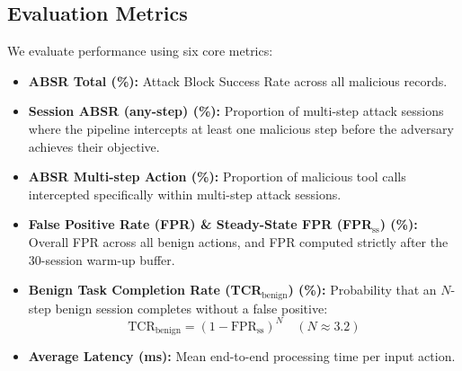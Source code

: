 \documentclass[conference]{IEEEtran}
\begin{document}
\subsection{Evaluation Metrics}
We evaluate performance using six core metrics:
\begin{itemize}[leftmargin=*]
    \item \textbf{ABSR Total (\%):} Attack Block Success Rate across all malicious records.
    \item \textbf{Session ABSR (any-step) (\%):} Proportion of multi-step attack sessions where the pipeline intercepts at least one malicious step before the adversary achieves their objective.
    \item \textbf{ABSR Multi-step Action (\%):} Proportion of malicious tool calls intercepted specifically within multi-step attack sessions.
    \item \textbf{False Positive Rate (FPR) \& Steady-State FPR (FPR$_{\text{ss}}$) (\%):} Overall FPR across all benign actions, and FPR computed strictly after the 30-session warm-up buffer.
    \item \textbf{Benign Task Completion Rate (TCR$_{\text{benign}}$) (\%):} Probability that an $N$-step benign session completes without a false positive:
    \begin{equation}
    \text{TCR}_{\text{benign}} = (1 - \text{FPR}_{\text{ss}})^N \quad (N \approx 3.2)
    \end{equation}
    \item \textbf{Average Latency (ms):} Mean end-to-end processing time per input action.
\end{itemize}
\end{document}
